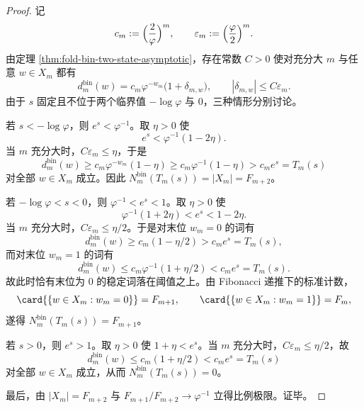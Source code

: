 \begin{proof}
记
\[
c_m:=\Bigl(\frac{2}{\varphi}\Bigr)^m,
\qquad
\varepsilon_m:=\Bigl(\frac{\varphi}{2}\Bigr)^m.
\]
由定理 \ref{thm:fold-bin-two-state-asymptotic}，存在常数 \(C>0\) 使对充分大 \(m\) 与任意 \(w\in X_m\) 都有
\[
d_m^{\mathrm{bin}}(w)=c_m\varphi^{-w_m}\bigl(1+\delta_{m,w}\bigr),
\qquad
|\delta_{m,w}|\le C\varepsilon_m.
\]
由于 \(s\) 固定且不位于两个临界值 \(-\log\varphi\) 与 \(0\)，三种情形分别讨论。

若 \(s<-\log\varphi\)，则 \(e^s<\varphi^{-1}\)。取 \(\eta>0\) 使
\[
e^s<\varphi^{-1}(1-2\eta).
\]
当 \(m\) 充分大时，\(C\varepsilon_m\le \eta\)，于是
\[
d_m^{\mathrm{bin}}(w)\ge c_m\varphi^{-w_m}(1-\eta)\ge c_m\varphi^{-1}(1-\eta)>c_m e^s=T_m(s)
\]
对全部 \(w\in X_m\) 成立。因此 \(N_m^{\mathrm{bin}}(T_m(s))=|X_m|=F_{m+2}\)。

若 \(-\log\varphi<s<0\)，则 \(\varphi^{-1}<e^s<1\)。取 \(\eta>0\) 使
\[
\varphi^{-1}(1+2\eta)<e^s<1-2\eta.
\]
当 \(m\) 充分大时，\(C\varepsilon_m\le \eta/2\)。于是对末位 \(w_m=0\) 的词有
\[
d_m^{\mathrm{bin}}(w)\ge c_m(1-\eta/2)>c_m e^s=T_m(s),
\]
而对末位 \(w_m=1\) 的词有
\[
d_m^{\mathrm{bin}}(w)\le c_m\varphi^{-1}(1+\eta/2)<c_m e^s=T_m(s).
\]
故此时恰有末位为 \(0\) 的稳定词落在阈值之上。由 Fibonacci 递推下的标准计数，
\[
\card{\{w\in X_m:w_m=0\}}=F_{m+1},
\qquad
\card{\{w\in X_m:w_m=1\}}=F_m,
\]
遂得 \(N_m^{\mathrm{bin}}(T_m(s))=F_{m+1}\)。

若 \(s>0\)，则 \(e^s>1\)。取 \(\eta>0\) 使 \(1+\eta<e^s\)。当 \(m\) 充分大时，\(C\varepsilon_m\le \eta/2\)，故
\[
d_m^{\mathrm{bin}}(w)\le c_m(1+\eta/2)<c_m e^s=T_m(s)
\]
对全部 \(w\in X_m\) 成立，从而 \(N_m^{\mathrm{bin}}(T_m(s))=0\)。

最后，由 \(|X_m|=F_{m+2}\) 与 \(F_{m+1}/F_{m+2}\to \varphi^{-1}\) 立得比例极限。证毕。
\end{proof}

